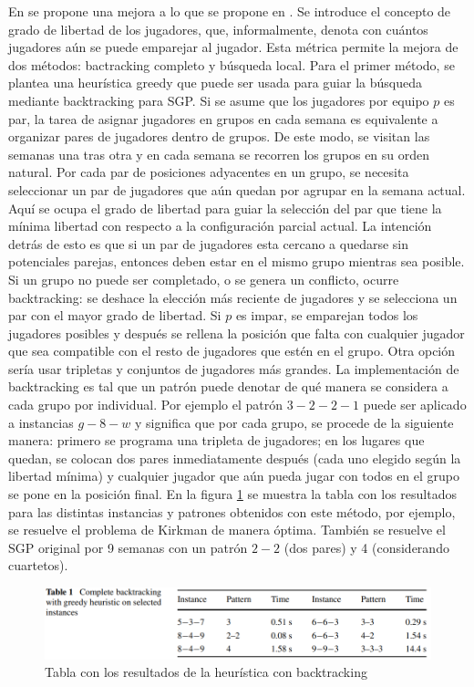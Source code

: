 \documentclass[letter, 10pt]{article}
\begin{document}
En \cite{triska2012effective} se propone una mejora a lo que se propone en \cite{dotu2005scheduling}. Se introduce el concepto de grado de libertad de los jugadores, que, informalmente, denota con cuántos jugadores aún se puede emparejar al jugador. Esta métrica permite la mejora de dos métodos: bactracking completo y búsqueda local. Para el primer método, se plantea una heurística greedy que puede ser usada para guiar la búsqueda mediante backtracking para SGP. Si se asume que los jugadores por equipo $p$ es par, la tarea de asignar jugadores en grupos en cada semana es equivalente a organizar pares de jugadores dentro de grupos. De este modo, se visitan las semanas una tras otra y en cada semana se recorren los grupos en su orden natural. Por cada par de posiciones adyacentes en un grupo, se necesita seleccionar un par de jugadores que aún quedan por agrupar en la semana actual. Aquí se ocupa el grado de libertad para guiar la selección del par que tiene la mínima libertad con respecto a la configuración parcial actual. La intención detrás de esto es que si un par de jugadores esta cercano a quedarse sin potenciales parejas, entonces deben estar en el mismo grupo mientras sea posible. Si un grupo no puede ser completado, o se genera un conflicto, ocurre backtracking: se deshace la elección más reciente de jugadores y se selecciona un par con el mayor grado de libertad. Si $p$ es impar, se emparejan todos los jugadores posibles y después se rellena la posición que falta con cualquier jugador que sea compatible con el resto de jugadores que estén en el grupo. Otra opción sería usar tripletas y conjuntos de jugadores más grandes. La implementación de backtracking es tal que un patrón puede denotar de qué manera se considera a cada grupo por individual. Por ejemplo el patrón $3-2-2-1$ puede ser aplicado a instancias $g-8-w$ y significa que por cada grupo, se procede de la siguiente manera: primero se programa una tripleta de jugadores; en los lugares que quedan, se colocan dos pares inmediatamente después (cada uno elegido según la libertad mínima) y cualquier jugador que aún pueda jugar con todos en el grupo se pone en la posición final. En la figura \ref{fig:tabla1greedybt} se muestra la tabla con los resultados para las distintas instancias y patrones obtenidos con este método, por ejemplo, se resuelve el problema de Kirkman de manera óptima. También se resuelve el SGP original por 9 semanas con un patrón $2-2$ (dos pares) y 4 (considerando cuartetos).

\begin{figure}[h]
    \centering
    \includegraphics[width=\textwidth]{figures/table1_greedybt.png}
    \caption{Tabla con los resultados de la heurística con backtracking}
    \label{fig:tabla1greedybt}
\end{figure}
\end{document}

